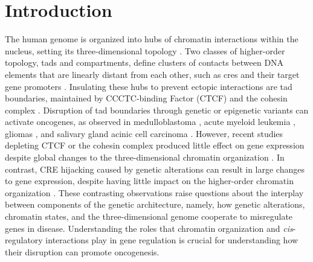 \section{Introduction}

The human genome is organized into hubs of chromatin interactions within the nucleus, setting its three-dimensional topology \cite{finnMolecularBasisBiological2019}.
Two classes of higher-order topology, \glspl{tad} and compartments, define clusters of contacts between DNA elements that are linearly distant from each other, such as \glspl{cre} and their target gene promoters \cite{dixonTopologicalDomainsMammalian2012,noraSpatialPartitioningRegulatory2012}.
Insulating these hubs to prevent ectopic interactions are \gls{tad} boundaries, maintained by CCCTC-binding Factor (CTCF) and the cohesin complex \cite{pomboThreedimensionalGenomeArchitecture2015}.
Disruption of \gls{tad} boundaries through genetic or epigenetic variants can activate oncogenes, as observed in medulloblastoma \cite{northcottEnhancerHijackingActivates2014}, acute myeloid leukemia \cite{groschelSingleOncogenicEnhancer2014}, gliomas \cite{flavahanInsulatorDysfunctionOncogene2016}, and salivary gland acinic cell carcinoma \cite{hallerEnhancerHijackingActivates2019}.
However, recent studies depleting CTCF or the cohesin complex produced little effect on gene expression despite global changes to the three-dimensional chromatin organization \cite{oudelaarRelationshipGenomeStructure2020,despangFunctionalDissectionSox92019,williamsonDevelopmentallyRegulatedShh2019}.
In contrast, CRE hijacking caused by genetic alterations can result in large changes to gene expression, despite having little impact on the higher-order chromatin organization \cite{northcottEnhancerHijackingActivates2014,zhouEmergenceNoncodingCancer2016}.
These contrasting observations raise questions about the interplay between components of the genetic architecture, namely, how genetic alterations, chromatin states, and the three-dimensional genome cooperate to misregulate genes in disease.
Understanding the roles that chromatin organization and \emph{cis}-regulatory interactions play in gene regulation is crucial for understanding how their disruption can promote oncogenesis.

